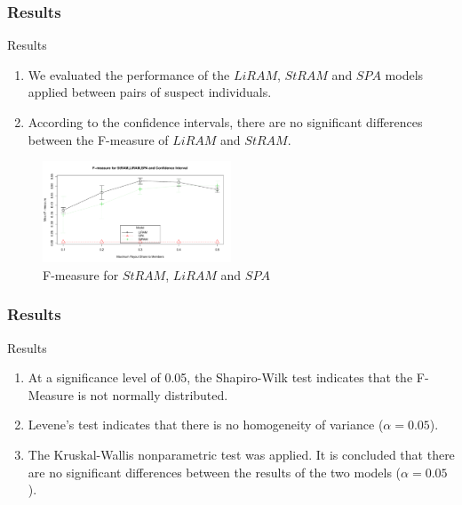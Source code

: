 \documentclass[aspectratio=169]{beamer}
\begin{document}
\begin{frame}
\frametitle{Results}
\begin{block}{Results}
  \footnotesize
  \begin{enumerate}
    \item We evaluated the performance of the $LiRAM$\cite{Troncoso201}, $StRAM$\cite{Troncoso201} and $SPA$\cite{xu204} models applied between pairs of suspect individuals.
    \item According to the confidence intervals, there are no significant differences between the F-measure of $LiRAM$ and $StRAM$.
  \end{enumerate}
\end{block}
\begin{figure}[ht]
  \centering
  \includegraphics[width=0.5\textwidth]{images/confidence-interval.pdf}
  \caption{\footnotesize F-measure for $StRAM$, $LiRAM$ and $SPA$}
\end{figure}
\end{frame}

\begin{frame}
\frametitle{Results}
\begin{block}{Results}
  \footnotesize
  \begin{enumerate}
    \item At a significance level of 0.05, the Shapiro-Wilk test indicates that the F-Measure is not normally distributed.
    \item Levene's test indicates that there is no homogeneity of variance ($\alpha = 0.05$).
    \item The Kruskal-Wallis nonparametric test was applied. It is concluded that there are no significant differences between the results of the two models ($\alpha = 0.05$).
  \end{enumerate}
\end{block}
\vfill

\end{frame}
\end{document}
